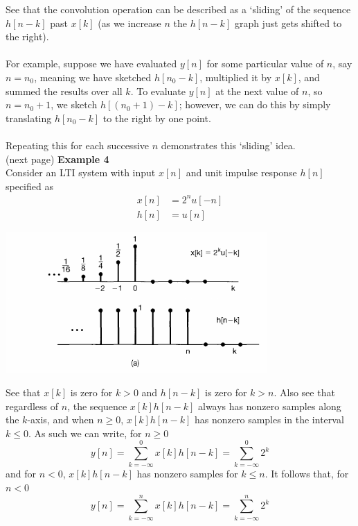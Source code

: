 \documentclass{report}
\begin{document}
See that the convolution operation can be described as a `sliding' of the sequence $h[n-k]$ past $x[k]$ 
(as we increase $n$ the $h[n-k]$ graph just gets shifted to the right).\\
\vspace{1mm}\\
For example, suppose we have evaluated $y[n]$ for some particular value of $n$, say $n=n_0$, meaning we have sketched $h[n_0-k]$, 
multiplied it by $x[k]$, and summed the results over all $k$.
To evaluate $y[n]$ at the next value of $n$, so $n=n_0+1$, we sketch $h[(n_0+1)-k]$; 
however, we can do this by simply translating $h[n_0-k]$ to the right by one point.\\
\vspace{1mm}\\
Repeating this for each successive $n$ demonstrates this `sliding' idea.\\
(next page)\newpage
\noindent\textbf{Example 4}\\
Consider an LTI system with input $x[n]$ and unit impulse response $h[n]$ specified as
\begin{align*}
x[n]&=2^nu[-n]\\
h[n]&=u[n]
\end{align*}
\begin{center}
\includegraphics[width=10cm]{a27}\\
\end{center}
See that $x[k]$ is zero for $k>0$ and $h[n-k]$ is zero for $k>n$.
Also see that regardless of $n$, the sequence $x[k]h[n-k]$ always has nonzero samples along the $k$-axis, and when $n\geq0$, 
$x[k]h[n-k]$ has nonzero samples in the interval $k\leq0$. As such we can write, for $n\geq0$
\begin{equation*}
y[n]=\sum^0_{k=-\infty} x[k]h[n-k]=\sum^0_{k=-\infty}2^k
\end{equation*}
and for $n<0$, $x[k]h[n-k]$ has nonzero samples for $k\leq n$. It follows that, for $n<0$
\begin{equation*}
y[n]=\sum^n_{k=-\infty} x[k]h[n-k]=\sum^n_{k=-\infty}2^k
\end{equation*}
\end{document}
